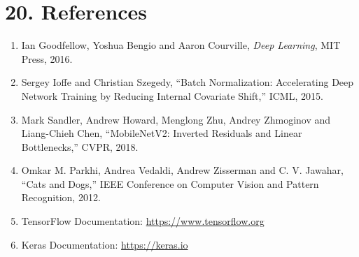 \documentclass[10pt]{article}
\begin{document}
\section*{20. References}

\begin{enumerate}
\item Ian Goodfellow, Yoshua Bengio and Aaron Courville,
\emph{Deep Learning}, MIT Press, 2016.

\item Sergey Ioffe and Christian Szegedy,
``Batch Normalization: Accelerating Deep Network Training by Reducing
Internal Covariate Shift,'' ICML, 2015.

\item Mark Sandler, Andrew Howard, Menglong Zhu, Andrey Zhmoginov and
Liang-Chieh Chen, ``MobileNetV2: Inverted Residuals and Linear
Bottlenecks,'' CVPR, 2018.

\item Omkar M. Parkhi, Andrea Vedaldi, Andrew Zisserman and C. V. Jawahar,
``Cats and Dogs,'' IEEE Conference on Computer Vision and Pattern
Recognition, 2012.

\item TensorFlow Documentation:
\url{https://www.tensorflow.org}

\item Keras Documentation:
\url{https://keras.io}
\end{enumerate}
\end{document}
